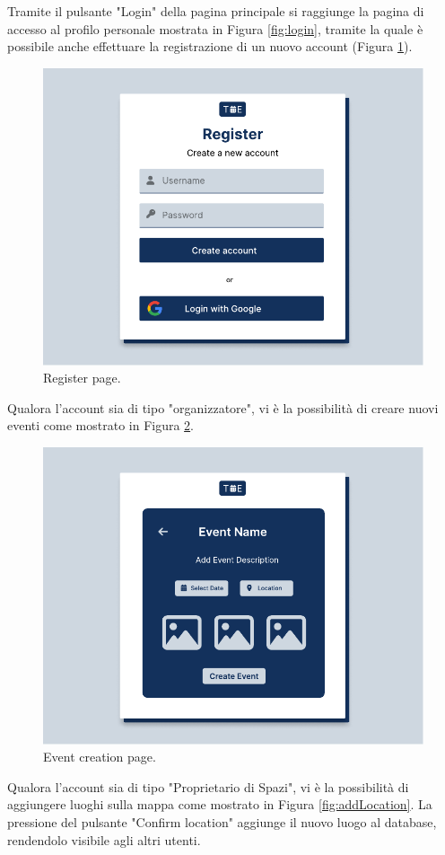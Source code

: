 \documentclass[9pt]{extarticle}
\begin{document}
Tramite il pulsante "Login" della pagina principale si raggiunge la pagina di accesso al profilo personale mostrata in Figura \ref{fig:login}, tramite la quale è possibile anche effettuare la registrazione di un nuovo account (Figura \ref{fig:register}).
\newpage

\begin{figure}[!htb]
	\centering
	\includegraphics[width=.7\linewidth]{./images/Register.pdf}
	\caption{Register page.}
	\label{fig:register}
\end{figure}

Qualora l'account sia di tipo "organizzatore", vi è la possibilità di creare nuovi eventi come mostrato in Figura \ref{fig:eventCreation}.
\newpage

\begin{figure}[!htb]
	\centering
	\includegraphics[width=.7\linewidth]{./images/EventCreation.pdf}
	\caption{Event creation page.}
	\label{fig:eventCreation}
\end{figure}

Qualora l'account sia di tipo "Proprietario di Spazi", vi è la possibilità di aggiungere luoghi sulla mappa come mostrato in Figura \ref{fig:addLocation}. La pressione del pulsante "Confirm location" aggiunge il nuovo luogo al database, rendendolo visibile agli altri utenti.
\end{document}
